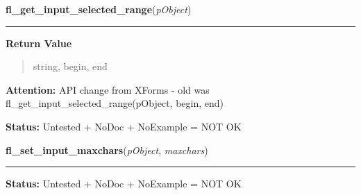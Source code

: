     \label{xformslib:library:fl_get_input_selected_range}

    \vspace{0.5ex}

\hspace{.8\funcindent}\begin{boxedminipage}{\funcwidth}

    \raggedright \textbf{fl\_get\_input\_selected\_range}(\textit{pObject})

    \vspace{-1.5ex}

    \rule{\textwidth}{0.5\fboxrule}
\setlength{\parskip}{2ex}
\setlength{\parskip}{1ex}
      \textbf{Return Value}
    \vspace{-1ex}

      \begin{quote}
      string, begin, end

      \end{quote}

\textbf{Attention:} API change from XForms - old was fl\_get\_input\_selected\_range(pObject, 
begin, end)



\textbf{Status:} Untested + NoDoc + NoExample = NOT OK



    \end{boxedminipage}

    \label{xformslib:library:fl_set_input_maxchars}

    \vspace{0.5ex}

\hspace{.8\funcindent}\begin{boxedminipage}{\funcwidth}

    \raggedright \textbf{fl\_set\_input\_maxchars}(\textit{pObject}, \textit{maxchars})

    \vspace{-1.5ex}

    \rule{\textwidth}{0.5\fboxrule}
\setlength{\parskip}{2ex}
\setlength{\parskip}{1ex}
\textbf{Status:} Untested + NoDoc + NoExample = NOT OK



    \end{boxedminipage}

